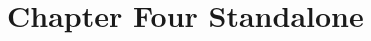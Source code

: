 \documentclass[../main.tex]{subfiles}
\begin{document}
\section{Chapter Four Standalone}
\label{sec:ch4}
\end{document}
